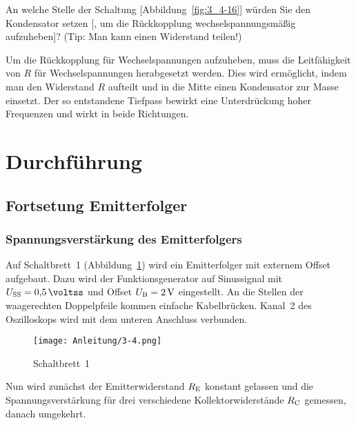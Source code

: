 \begin{problem}
    An welche Stelle der Schaltung [Abbildung~\ref{fig:3_4-16}] würden Sie den
    Kondensator setzen [, um die Rückkopplung wechselspannungsmäßig
    aufzuheben]? (Tip: Man kann einen Widerstand teilen!)
\end{problem}

Um die Rückkopplung für Wechselspannungen aufzuheben, muss die Leitfähigkeit
von $R$ für Wechselspannungen herabgesetzt werden. Dies wird ermöglicht, indem
man den Widerstand $R$ aufteilt und in die Mitte einen Kondensator zur Masse
einsetzt. Der so entstandene Tiefpass bewirkt eine Unterdrückung hoher
Frequenzen und wirkt in beide Richtungen.


\FloatBarrier
\section{Durchführung}

\FloatBarrier
\subsection{Fortsetung Emitterfolger}

\subsubsection{Spannungsverstärkung des Emitterfolgers}

Auf Schaltbrett~1 (Abbildung~\ref{fig:3-4}) wird ein Emitterfolger mit externem
Offset aufgebaut. Dazu wird der Funktionsgenerator auf Sinussignal mit
$U_\text{SS} = \SI{0.5}{\voltss}$ und Offset $\UB = \SI2{\volt}$ eingestellt.
An die Stellen der waagerechten Doppelpfeile kommen einfache Kabelbrücken.
Kanal~2 des Oszilloskops wird mit dem unteren Anschluss verbunden.

\begin{figure}[htbp]
    \centering
    \texttt{[image: Anleitung/3-4.png]}
    \caption{%
        Schaltbrett~1 \cite[Abbildung~3.4]{physik313-Anleitung}
    }
    \label{fig:3-4}
\end{figure}

Nun wird zunächst der Emitterwiderstand $\RE$ konstant gelassen und die
Spannungsverstärkung für drei verschiedene Kollektorwiderstände $\RC$ gemessen,
danach umgekehrt.

